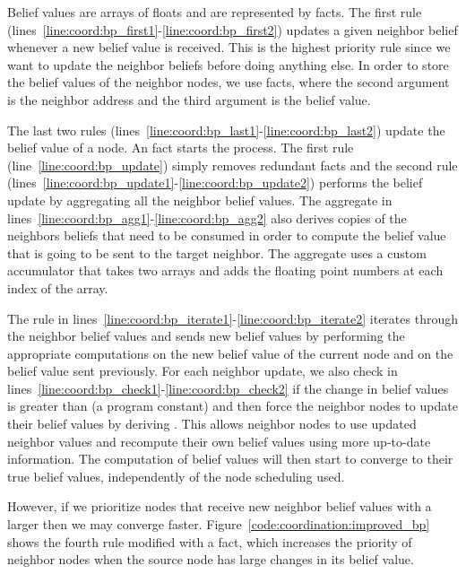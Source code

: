 \clearpage

Belief values are arrays of floats and are represented by  facts.
The first rule (lines~\ref{line:coord:bp_first1}-\ref{line:coord:bp_first2})
updates a given neighbor belief whenever a new belief value is received. This is
the highest priority rule since we want to update the neighbor beliefs before
doing anything else. In order to store the belief values of the neighbor nodes,
we use  facts, where the second argument is the neighbor
address and the third argument is the belief value.

The last two rules (lines~\ref{line:coord:bp_last1}-\ref{line:coord:bp_last2})
update the belief value of a node. An  fact starts the process.
The first rule (line~\ref{line:coord:bp_update}) simply removes redundant
 facts and the second rule
(lines~\ref{line:coord:bp_update1}-\ref{line:coord:bp_update2}) performs the
belief update by aggregating all the neighbor belief values. The aggregate in
lines~\ref{line:coord:bp_agg1}-\ref{line:coord:bp_agg2} also derives copies of
the neighbors beliefs that need to be consumed in order to compute the belief
value that is going to be sent to the target neighbor. The aggregate uses a
custom accumulator that takes two arrays and adds the floating point numbers at
each index of the array.

The rule in lines~\ref{line:coord:bp_iterate1}-\ref{line:coord:bp_iterate2}
iterates through the neighbor belief values and sends new belief values by
performing the appropriate computations on the new belief value of the current
node and on the belief value sent previously. For each neighbor update, we also
check in lines~\ref{line:coord:bp_check1}-\ref{line:coord:bp_check2} if the
change in belief values is greater than  (a program constant) and
then force the neighbor nodes to update their belief values by deriving
. This allows neighbor nodes to use updated neighbor values and
recompute their own belief values using more up-to-date information. The
computation of belief values will then start to converge to their true belief
values, independently of the node scheduling used.

However, if we prioritize nodes that receive new neighbor belief values with a
larger  then we may converge faster.
Figure~\ref{code:coordination:improved_bp} shows the fourth rule modified with a
 fact, which increases the priority of neighbor nodes when
the source node has large changes in its belief value.

